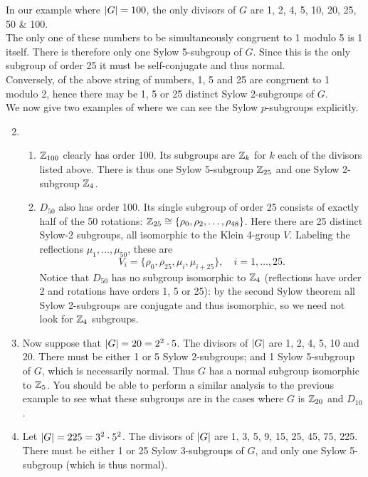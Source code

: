 \begin{examples}{}{}
\exstart In our example where $\left| G\right|=100$, the only divisors of $G$ are 1, 2, 4, 5, 10, 20, 25, 50 \& 100.\\
The only one of these numbers to be simultaneously congruent to 1 modulo 5 is 1 itself. There is therefore only one Sylow 5-subgroup of $G$. Since this is the only subgroup of order 25 it must be self-conjugate and thus normal.\\
Conversely, of the above string of numbers, 1, 5 and 25 are congruent to 1 modulo 2, hence there may be 1, 5 or 25 distinct Sylow 2-subgroups of $G$.\\
We now give two examples of where we can see the Sylow $p$-subgroups explicitly.
\begin{enumerate}\setcounter{enumi}{1}
\item[]\begin{enumerate}
	\item $\mathbb{Z}_{100}$ clearly has order 100. Its subgroups are $\mathbb{Z}_k$ for $k$ each of the divisors listed above. There is thus one Sylow 5-subgroup $\mathbb{Z}_{25}$ and one Sylow 2-subgroup $\mathbb{Z}_4$.
	\item $D_{50}$ also has order 100. Its single subgroup of order 25 consists of exactly half of the 50 rotations: $\mathbb{Z}_{25}\cong\{\rho_0,\rho_2,\ldots,\rho_{48}\}$. Here there are 25 distinct Sylow-2 subgroups, all isomorphic to the Klein 4-group $V$. Labeling the reflections $\mu_1,\ldots,\mu_{50}$, these are
	\[V_i=\{\rho_0,\rho_{25},\mu_i,\mu_{i+25}\},\quad i=1,\ldots,25.\]
	Notice that $D_{50}$ has no subgroup isomorphic to $\mathbb{Z}_4$ (reflections have order 2 and rotations have orders 1, 5 or 25): by the second Sylow theorem all Sylow 2-subgroups are conjugate and thus isomorphic, so we need not look for $\mathbb{Z}_4$ subgroups.
	\end{enumerate}

\item Now suppose that $\left| G\right|=20=2^2\cdot 5$. The divisors of $\left| G\right|$ are 1, 2, 4, 5, 10 and 20. There must be either 1 or 5 Sylow 2-subgroups; and 1 Sylow 5-subgroup of $G$, which is necessarily normal. Thus $G$ has a normal subgroup isomorphic to $\mathbb{Z}_5$. You should be able to perform a similar analysis to the previous example to see what these subgroups are in the cases where $G$ is $\mathbb{Z}_{20}$ and $D_{10}$.

\item Let $\left| G\right|=225=3^2\cdot 5^2$. The divisors of $\left| G\right|$ are 1, 3, 5, 9, 15, 25, 45, 75, 225. There must be either 1 or 25 Sylow 3-subgroups of $G$, and only one Sylow 5-subgroup (which is thus normal).


\end{enumerate}
\end{examples}
